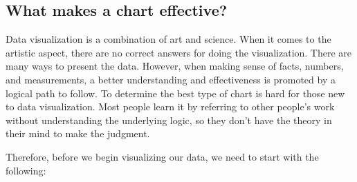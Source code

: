 \documentclass[]{book}
\begin{document}
\subsection{What makes a chart
effective?}\label{what-makes-a-chart-effective}

Data visualization is a combination of art and science. When it comes to
the artistic aspect, there are no correct answers for doing the
visualization. There are many ways to present the data. However, when
making sense of facts, numbers, and measurements, a better understanding
and effectiveness is promoted by a logical path to follow. To determine
the best type of chart is hard for those new to data visualization. Most
people learn it by referring to other people's work without
understanding the underlying logic, so they don't have the theory in
their mind to make the judgment.

Therefore, before we begin visualizing our data, we need to start with
the following:
\end{document}
